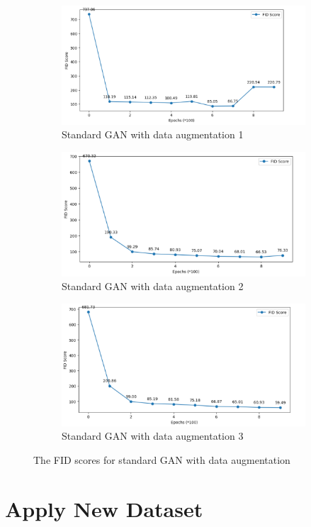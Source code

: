 \begin{figure}[H]
    \centering
    \begin{subfigure}[b]{\linewidth}
        \centering
        \includegraphics[width=0.8\linewidth]{./Images/standard_GAN_with_data_augementation1.jpg}
        \caption{Standard GAN with data augmentation 1}
        \label{fig:Dense}
    \end{subfigure}
    \vspace{0.05\linewidth} 
    \begin{subfigure}[b]{\linewidth}
        \centering
        \includegraphics[width=0.8\linewidth]{./Images/standard_GAN_with_data_augementation2.jpg}
        \caption{Standard GAN with data augmentation 2}
        \label{fig:Conv2DTranspose}
    \end{subfigure}
    \begin{subfigure}[b]{\linewidth}
        \centering
        \includegraphics[width=0.8\linewidth]{./Images/standard_GAN_with_data_augementation3.jpg}
        \caption{Standard GAN with data augmentation 3}
        \label{fig:Conv2DTranspose}
    \end{subfigure}
    \caption{The FID scores for standard GAN with data augmentation}
    \label{fig:combined}
\end{figure}

\section*{Apply New Dataset}